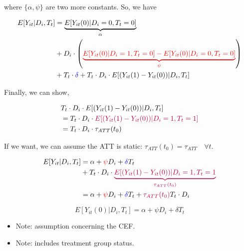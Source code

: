 \documentclass[
  letterpaper,
  DIV=11,
  numbers=noendperiod]{scrreprt}
\providecommand{\tightlist}{%
  \setlength{\itemsep}{0pt}\setlength{\parskip}{0pt}}\usepackage{longtable,booktabs,array}
\theoremstyle{definition}
\theoremstyle{remark}
\begin{document}
\begin{enumerate}
  where \(\{ \alpha, \psi \}\) are two more constants. So, we have

  \[
  \begin{aligned}
  E[Y_{it}|D_i,T_t] &= \underbrace{E[Y_{it}(0)|D_i=0,T_t=0]}_{\alpha} \\
  &+ D_i \cdot \left( \textcolor{red}{\underbrace{E[Y_{it}(0)|D_i=1,T_t=0] - E[Y_{it}(0)|D_i=0,T_t=0]}_{\psi}} \right) \\
  &+ T_t \cdot \textcolor{blue}{\delta} + T_t \cdot D_i \cdot E[(Y_{it}(1)-Y_{it}(0))|D_i,T_t]
  \end{aligned}
  \]

  Finally, we can show,

  \[
  \begin{aligned}
  &T_t \cdot D_i \cdot E[(Y_{it}(1) - Y_{it}(0))|D_i,T_t] \\
  &= T_t \cdot D_i \cdot \textcolor{purple}{E[(Y_{it}(1) - Y_{it}(0))|D_i=1,T_t=1]} \\
  &= T_t \cdot D_i \cdot \tau_{ATT}(t_0) 
  \end{aligned}
  \]

  If we want, we can assume the ATT is static:
  \(\tau_{ATT}(t_0) = \tau_{ATT} \quad \forall t\).

  \[
  \begin{aligned}
  E[Y_{it}|D_i,T_t] &= \alpha + \textcolor{red}{\psi}D_i + \textcolor{blue}{\delta}T_t \\
  &+ T_t \cdot D_i \cdot \textcolor{purple}{\underbrace{E[(Y_{it}(1) - Y_{it}(0))|D_i=1,T_t=1}_{\tau_{ATT}(t_0)}} \\
  &= \alpha + \textcolor{red}{\psi}D_i + \textcolor{blue}{\delta}T_t + \textcolor{purple}{\tau_{ATT}(t_0)} T_t \cdot D_i
  \end{aligned}
  \]

  \begin{tcolorbox}[enhanced jigsaw, bottomrule=.15mm, coltitle=black, arc=.35mm, left=2mm, opacityback=0, leftrule=.75mm, colbacktitle=quarto-callout-note-color!10!white, title={Parallel Trends Assumption (Parametric version)}, toprule=.15mm, bottomtitle=1mm, breakable, colframe=quarto-callout-note-color-frame, opacitybacktitle=0.6, titlerule=0mm, colback=white, rightrule=.15mm, toptitle=1mm]

  \[
  E[Y_{it}(0)|D_i,T_t] = \alpha + \psi D_i + \delta T_t
  \]

  \end{tcolorbox}

  \begin{itemize}
  \tightlist
  \item
    Note: assumption concerning the CEF.
  \item
    Note: includes treatment group status.
  \end{itemize}


\end{enumerate}
\end{document}
